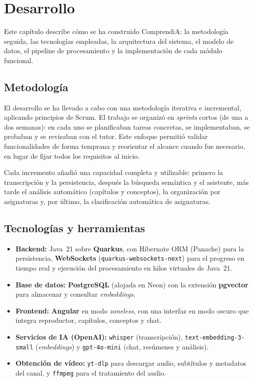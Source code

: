 \chapter{Desarrollo}
\label{cap:desarrollo}

Este capítulo describe cómo se ha construido ComprendiA: la metodología seguida, las
tecnologías empleadas, la arquitectura del sistema, el modelo de datos, el pipeline de
procesamiento y la implementación de cada módulo funcional.

\section{Metodología}

El desarrollo se ha llevado a cabo con una metodología iterativa e incremental, aplicando
principios de Scrum. El trabajo se organizó en \textit{sprints} cortos (de una a dos semanas):
en cada uno se planificaban tareas concretas, se implementaban, se probaban y se revisaban con
el tutor. Este enfoque permitió validar funcionalidades de forma temprana y reorientar el
alcance cuando fue necesario, en lugar de fijar todos los requisitos al inicio.

Cada incremento añadió una capacidad completa y utilizable: primero la transcripción y la
persistencia, después la búsqueda semántica y el asistente, más tarde el análisis automático
(capítulos y conceptos), la organización por asignaturas y, por último, la clasificación
automática de asignaturas.

\section{Tecnologías y herramientas}

\begin{itemize}
  \item \textbf{Backend:} Java~21 sobre \textbf{Quarkus}, con Hibernate ORM (Panache) para la
        persistencia, \textbf{WebSockets} (\texttt{quarkus-websockets-next}) para el progreso en
        tiempo real y ejecución del procesamiento en hilos virtuales de Java~21.
  \item \textbf{Base de datos:} \textbf{PostgreSQL} (alojada en Neon) con la extensión
        \textbf{pgvector} para almacenar y consultar \textit{embeddings}.
  \item \textbf{Frontend:} \textbf{Angular} en modo \textit{zoneless}, con una interfaz en modo
        oscuro que integra reproductor, capítulos, conceptos y chat.
  \item \textbf{Servicios de IA (OpenAI):} \texttt{whisper} (transcripción),
        \texttt{text-embedding-3-small} (\textit{embeddings}) y \texttt{gpt-4o-mini} (chat,
        resúmenes y análisis).
  \item \textbf{Obtención de vídeo:} \texttt{yt-dlp} para descargar audio, subtítulos y
        metadatos del canal, y \texttt{ffmpeg} para el tratamiento del audio.
\end{itemize}


